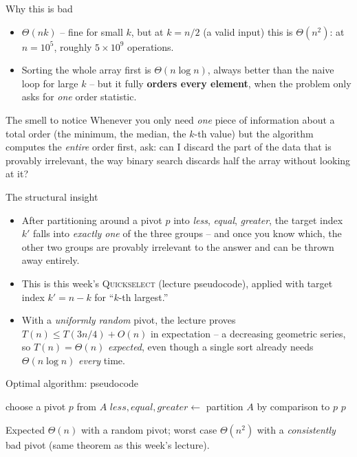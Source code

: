 \documentclass[11pt,aspectratio=169]{beamer}
\begin{document}
\begin{frame}{Why this is bad}
  \begin{itemize}
    \item $\Theta(nk)$ -- fine for small $k$, but at $k = n/2$ (a valid input) this is
    $\Theta(n^2)$: at $n=10^5$, roughly $5\times10^9$ operations.
    \item Sorting the whole array first is $\Theta(n \log n)$, always better than the naive
    loop for large $k$ -- but it fully \textbf{orders every element}, when the problem only
    asks for \emph{one} order statistic.
  \end{itemize}
  \begin{alertblock}{The smell to notice}
    Whenever you only need \emph{one} piece of information about a total order (the
    minimum, the median, the $k$-th value) but the algorithm computes the \emph{entire}
    order first, ask: can I discard the part of the data that is provably irrelevant, the
    way binary search discards half the array without looking at it?
  \end{alertblock}
\end{frame}

\begin{frame}{The structural insight}
  \begin{itemize}
    \item After partitioning around a pivot $p$ into \textit{less}, \textit{equal},
    \textit{greater}, the target index $k'$ falls into \emph{exactly one} of the three
    groups -- and once you know which, the other two groups are provably irrelevant to
    the answer and can be thrown away entirely.
    \item This is this week's \textsc{Quickselect} (lecture pseudocode), applied with
    target index $k' = n - k$ for ``$k$-th largest.''
    \item With a \emph{uniformly random} pivot, the lecture proves
    $T(n) \le T(3n/4) + O(n)$ in expectation -- a decreasing geometric series, so
    $T(n) = \Theta(n)$ \emph{expected}, even though a single sort already needs
    $\Theta(n \log n)$ \emph{every} time.
  \end{itemize}
\end{frame}

\begin{frame}{Optimal algorithm: pseudocode}
  \footnotesize
  \begin{algorithmic}[1]
      \State \Return {} 
    \EndFunction
      \State choose a pivot $p$ from $A$ 
      \State $less, equal, greater \gets$ partition $A$ by comparison to $p$
       \State \Return {}
       \State \Return $p$
      \Else \State \Return {}
      \EndIf
    \EndFunction
  \end{algorithmic}
  Expected $\Theta(n)$ with a random pivot; worst case $\Theta(n^2)$ with a
  \emph{consistently} bad pivot (same theorem as this week's lecture).
\end{frame}
\end{document}
